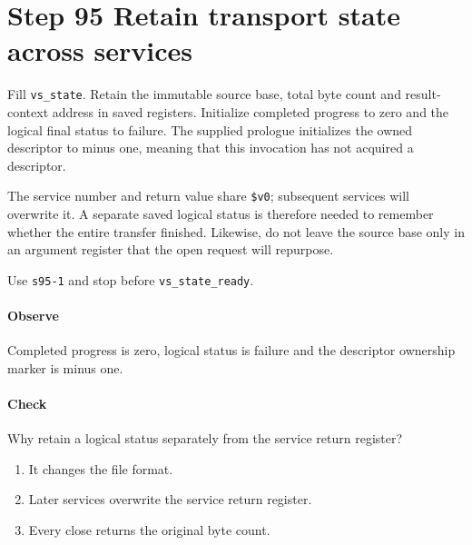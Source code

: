 \section{Step 95 Retain transport state across services}
Fill \texttt{vs\_state}. Retain the immutable source base, total byte count and result-context address in saved registers. Initialize completed progress to zero and the logical final status to failure. The supplied prologue initializes the owned descriptor to minus one, meaning that this invocation has not acquired a descriptor.

The service number and return value share \texttt{\$v0}; subsequent services will overwrite it. A separate saved logical status is therefore needed to remember whether the entire transfer finished. Likewise, do not leave the source base only in an argument register that the open request will repurpose.

Use \texttt{s95-1} and stop before \texttt{vs\_state\_ready}.

\paragraph{Observe} Completed progress is zero, logical status is failure and the descriptor ownership marker is minus one.

\paragraph{Check} Why retain a logical status separately from the service return register?
\begin{enumerate}[label=\Alph*.]
\item It changes the file format.
\item Later services overwrite the service return register.
\item Every close returns the original byte count.
\end{enumerate}
